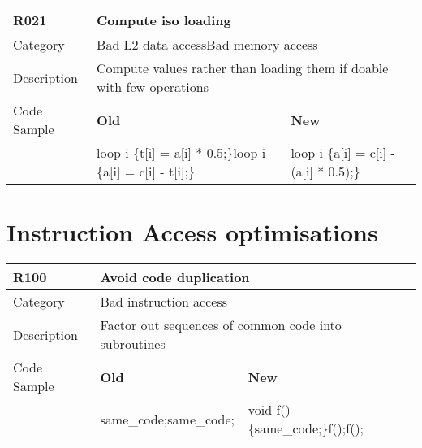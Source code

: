 \begin{tabular}{|p{0.9in}|p{2.0in}|p{2.0in}|} \hline
\textbf{R021}       & \multicolumn{2}{|p{4.0in}|}{\textbf{Compute iso loading}} \\ \hline
Category            & \multicolumn{2}{|p{4.0in}|}{Bad L2 data access\newline Bad memory access} \\ \hline
Description         & \multicolumn{2}{|p{4.0in}|}{Compute values rather than loading them if doable with few operations} \\ \hline
Code Sample         & \textbf{Old} & \textbf{New} \\ \hline
                    & loop i \{\newline   t[i] = a[i] * 0.5;\newline \}\newline loop i \{\newline   a[i] = c[i] - t[i];\newline \}
                    & loop i \{\newline   a[i] = c[i] - (a[i] * 0.5);\newline \} \\ \hline
\end{tabular}

\section{Instruction Access optimisations}
\label{sec:Instruction_Access_Optimizations}

\begin{tabular}{|p{0.9in}|p{2.0in}|p{2.0in}|} \hline
\textbf{R100}       & \multicolumn{2}{|p{4.0in}|}{\textbf{Avoid code duplication}} \\ \hline
Category            & \multicolumn{2}{|p{4.0in}|}{Bad instruction access} \\ \hline
Description         & \multicolumn{2}{|p{4.0in}|}{Factor out sequences of common code into subroutines} \\ \hline
Code Sample         & \textbf{Old} & \textbf{New} \\ \hline
                    & same\_code;\newline same\_code;
                    & void f() \{same\_code;\}\newline f();\newline f(); \\ \hline
\end{tabular}

